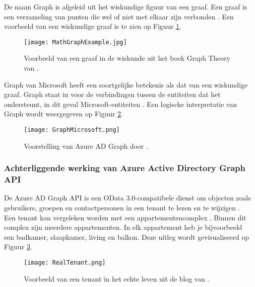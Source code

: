 De naam Graph is afgeleid uit het wiskundige figuur van een graaf. Een graaf is een verzameling van punten die wel of niet met elkaar zijn verbonden \autocite{Denaux2022}. Een voorbeeld van een wiskundige graaf is te zien op Figuur \ref{mga}. \\

\begin{figure}[!b]
    \texttt{[image: MathGraphExample.jpg]}
    \caption[Voorbeeld wiskundige graaf]{Voorbeeld van een graaf in de wiskunde uit het boek Graph Theory van \textcite{Diestel2010}.}
    \label{mga}
\end{figure}

Graph van Microsoft heeft een soortgelijke betekenis als dat van een wiskundige graaf. Graph staat in voor de verbindingen tussen de entiteiten dat het ondersteunt, in dit geval Microsoft-entiteiten \autocite{Kokkarinen2022}. Een logische interpretatie van Graph wordt weergegeven op Figuur \ref{gms}. \\

\begin{figure}[!b]
    \texttt{[image: GraphMicrosoft.png]}
    \caption[Voorbeeld Azure AD Graph]{Voorstelling van Azure \Ac{AD} Graph door \textcite{Microsoft2017}.}
    \label{gms}
\end{figure}

\subsubsection{Achterliggende werking van Azure Active Directory Graph API}



De Azure \ac{AD} Graph \ac{API} is een OData 3.0-compatibele dienst om objecten zoals gebruikers, groepen en contactpersonen in een tenant te lezen en te wijzigen \autocite{Microsoft2016}. \\

Een tenant kan vergeleken worden met een appartementencomplex \autocite{Saxton2015}. Binnen dit complex zijn meerdere appartementen. In elk appartement heb je bijvoorbeeld een badkamer, slaapkamer, living en balkon. Deze uitleg wordt gevisualiseerd op Figuur \ref{rlt}. \\

\begin{figure}[!h]
    \texttt{[image: RealTenant.png]}
    \caption[Voorbeeld werkelijke tenant]{Voorbeeld van een tenant in het echte leven uit de blog van \textcite{Saxton2015}.}
    \label{rlt}
\end{figure}

